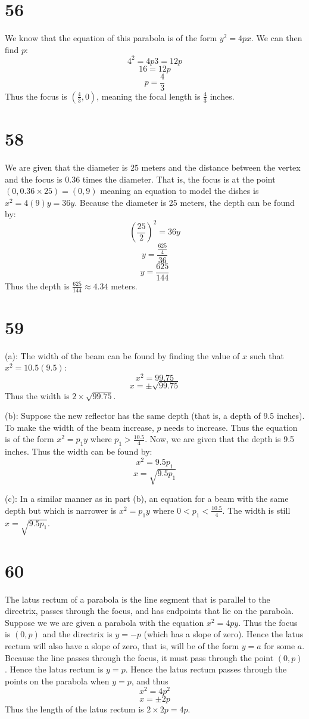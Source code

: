 \documentclass{article}
\theoremstyle{definition}
\newcommand{\?}{\stackrel{?}{=}}
\begin{document}
\section*{56}
We know that the equation of this parabola is of the form $y^2=4px$. We can then find $p$: \[ 4^2=4p3=12p \] \[ 16=12p \] \[ p=\frac{4}{3} \]
Thus the focus is $(\frac{4}{3},0)$, meaning the focal length is $\frac{4}{3}$ inches.

\section*{58}
We are given that the diameter is $25$ meters and the distance between the vertex and the focus is $0.36$ times the diameter. That is, the focus is at the point 
$(0,0.36\times 25)=(0,9)$ meaning an equation to model the dishes is $x^2=4(9)y=36y$. Because the diameter is 25 meters, the depth can be found by:
\[ (\frac{25}{2})^2=36y \] \[ y=\dfrac{\frac{625}{4}}{36} \] \[ y=\frac{625}{144} \] Thus the depth is 
$\frac{625}{144}\approx 4.34$ meters.

\section*{59}
(a): The width of the beam can be found by finding the value of $x$ such that $x^2=10.5(9.5)$:
\[ x^2=99.75 \] \[ x=\pm\sqrt{99.75} \] Thus the width is $2\times\sqrt{99.75}$. 


(b): Suppose the new reflector has the same depth (that is, a depth of 9.5 inches). To make the width of the beam increase, $p$ needs to increase. Thus the equation is of the form 
$x^2=p_1y$ where $p_1>\frac{10.5}{4}$. Now, we are given that the depth is 9.5 inches. Thus the width can be found by:
\[ x^2=9.5p_1 \] \[ x=\sqrt{9.5p_1} \]


(c): In a similar manner as in part (b), an equation for a beam with the same depth but which is narrower is $x^2=p_1y$ where $0<p_1<\frac{10.5}{4}$. The width is still 
$x=\sqrt{9.5p_1}$.

\section*{60}
The latus rectum of a parabola is the line segment that is parallel to the directrix, passes through the focus, and has endpoints that lie on the parabola. Suppose we we are given a 
parabola with the equation $x^2=4py$. Thus the focus is $(0,p)$ and the directrix is $y=-p$ (which has a slope of zero). Hence the latus rectum will also have a slope of zero, that is, 
will be of the form $y=a$ for some $a$. Because the line passes through the focus, it must pass through the point $(0,p)$. Hence the latus rectum is $y=p$. Hence the latus rectum passes through the 
points on the parabola when $y=p$, and thus \[ x^2=4p^2 \] \[ x=\pm 2p \] Thus the length of the latus rectum is $2\times 2p=4p$.
\end{document}
